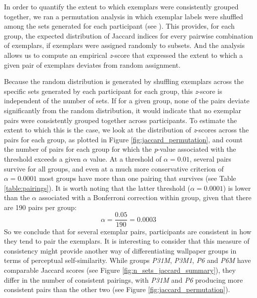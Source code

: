 \documentclass[11pt, twoside]{article}
\begin{document}
In order to quantify the extent to which exemplars were consistently grouped together, we ran a permutation analysis in which exemplar labels were shuffled among the sets generated for each participant (see ). This provides, for each group, the expected distribution of Jaccard indices for every pairwise combination of exemplars, if exemplars were assigned randomly to subsets. And the analysis allows us to compute an empirical \textit{z}-score that expressed the extent to which a given pair of exemplars deviates from random assignment. 

Because the random distribution is generated by shuffling exemplars across the specific sets generated by each participant for each group, this \textit{z}-score is independent of the number of sets. If for a given group, none of the pairs deviate significantly from the random distribution, it would indicate that no exemplar pairs were consistently grouped together across participants. To estimate the extent to which this is the case, we look at the distribution of \textit{z}-scores across the pairs for each group, as plotted in Figure \ref{fig:jaccard_permutation}, and count the number of pairs for each group for which the \textit{p}-value associated with the threshold exceeds a given $\alpha$ value. At a threshold of $\alpha = 0.01$, several pairs survive for all groups, and even at a much more conservative criterion of $\alpha = 0.0001$ most groups have more than one pairing that survives (see Table \ref{table:pairings}). It is worth noting that the latter threshold ($\alpha = 0.0001$) is lower than the $\alpha$ associated with a Bonferroni correction within group, given that there are 190 pairs per group: \[ \alpha = \frac{0.05}{190} = 0.0003 \] So we conclude that for several exemplar pairs, participants are consistent in how they tend to pair the exemplars. It is interesting to consider that this measure of consistency might provide another way of differentiating wallpaper groups in terms of perceptual self-similarity. While groups \textit{P31M}, \textit{P3M1}, \textit{P6} and \textit{P6M} have comparable Jaccard scores (see Figure \ref{fig:n_sets_jaccard_summary}), they differ in the number of consistent pairings, with \textit{P31M} and \textit{P6} producing more consistent pairs than the other two (see Figure \ref{fig:jaccard_permutation}). 
\end{document}
